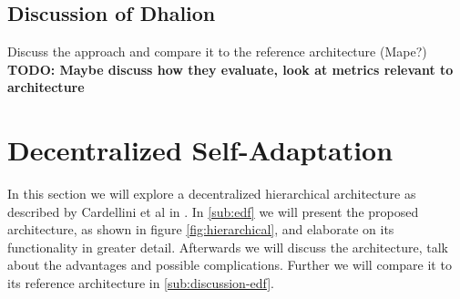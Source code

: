         \subsection{Discussion of Dhalion}
        \label{sub:dhalion-discussion}
        Discuss the approach and compare it to the reference architecture (Mape?)
        \textbf{TODO: Maybe discuss how they evaluate, look at metrics relevant to architecture}

    \section{Decentralized Self-Adaptation}
    \label{sec:hierarchical}
    In this section we will explore a decentralized hierarchical architecture as described by Cardellini et al in \cite{cardellini}.
    In \ref{sub:edf} we will present the proposed architecture, as shown in figure \ref{fig:hierarchical}, and elaborate on its functionality in greater detail.
    Afterwards we will discuss the architecture, talk about the advantages and possible complications. Further we will compare it to its reference architecture in \ref{sub:discussion-edf}.


